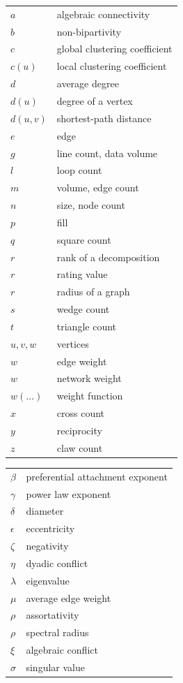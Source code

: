 \documentclass{article}
\begin{document}
\begin{tabular}{ll}
  $a$ & algebraic connectivity \\
  $b$ & non-bipartivity \\
  $c$ & global clustering coefficient \\
  $c(u)$ & local clustering coefficient \\
  $d$ & average degree \\
  $d(u)$ & degree of a vertex \\
  $d(u,v)$ & shortest-path distance \\
  $e$ & edge \\
  $g$ & line count, data volume \\
  $l$ & loop count \\
  $m$ & volume, edge count \\
  $n$ & size, node count \\
  $p$ & fill \\
  $q$ & square count \\
  $r$ & rank of a decomposition \\
  $r$ & rating value \\
  $r$ & radius of a graph \\
  $s$ & wedge count \\
  $t$ & triangle count \\
  $u, v, w$ & vertices \\
  $w$ & edge weight \\ 
  $w$ & network weight \\
  $w(\ldots)$ & weight function \\
  $x$ & cross count \\
  $y$ & reciprocity \\
  $z$ & claw count
\end{tabular}

\begin{tabular}{ll}
  $\beta$  & preferential attachment exponent \\
  $\gamma$ & power law exponent \\
  $\delta$ & diameter \\
  $\epsilon$ & eccentricity \\
  $\zeta$ & negativity \\
  $\eta$ & dyadic conflict \\
  $\lambda$ & eigenvalue \\
  $\mu$ & average edge weight \\
  $\rho$ & assortativity \\
  $\rho$ & spectral radius \\
  $\xi$ & algebraic conflict \\
  $\sigma$ & singular value 
\end{tabular}
\end{document}

